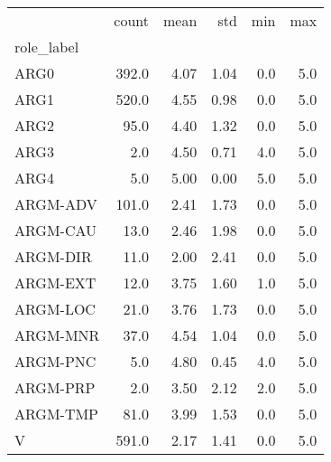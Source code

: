 \begin{tabular}{lrrrrr}
\toprule
{} &  count &  mean &   std &  min &  max \\
role\_label &        &       &       &      &      \\
\midrule
ARG0       &  392.0 &  4.07 &  1.04 &  0.0 &  5.0 \\
ARG1       &  520.0 &  4.55 &  0.98 &  0.0 &  5.0 \\
ARG2       &   95.0 &  4.40 &  1.32 &  0.0 &  5.0 \\
ARG3       &    2.0 &  4.50 &  0.71 &  4.0 &  5.0 \\
ARG4       &    5.0 &  5.00 &  0.00 &  5.0 &  5.0 \\
ARGM-ADV   &  101.0 &  2.41 &  1.73 &  0.0 &  5.0 \\
ARGM-CAU   &   13.0 &  2.46 &  1.98 &  0.0 &  5.0 \\
ARGM-DIR   &   11.0 &  2.00 &  2.41 &  0.0 &  5.0 \\
ARGM-EXT   &   12.0 &  3.75 &  1.60 &  1.0 &  5.0 \\
ARGM-LOC   &   21.0 &  3.76 &  1.73 &  0.0 &  5.0 \\
ARGM-MNR   &   37.0 &  4.54 &  1.04 &  0.0 &  5.0 \\
ARGM-PNC   &    5.0 &  4.80 &  0.45 &  4.0 &  5.0 \\
ARGM-PRP   &    2.0 &  3.50 &  2.12 &  2.0 &  5.0 \\
ARGM-TMP   &   81.0 &  3.99 &  1.53 &  0.0 &  5.0 \\
V          &  591.0 &  2.17 &  1.41 &  0.0 &  5.0 \\
\bottomrule
\end{tabular}
